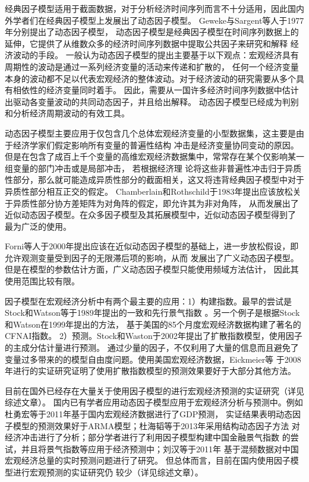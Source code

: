经典因子模型适用于截面数据，对于分析经济时间序列而言不十分适用，因此国内外学者们在经典因子模型上发展出了动态因子模型。
Geweke\cite{geweke1977dynamic}与Sargent\cite{sargent1977business}等人于1977年分别提出了动态因子模型，
动态因子模型是经典因子模型在时间序列数据上的延伸，它提供了从维数众多的经济时间序列数据中提取公共因子来研究和解释
经济波动的手段。
一般认为动态因子模型的提出主要基于以下观点：宏观经济具有周期性的波动是通过一系列经济变量的活动来传递和扩散的，
任何一个经济变量本身的波动都不足以代表宏观经济的整体波动。对于经济波动的研究需要从多个具有相依性的经济变量同时着手。
因此，需要从一国许多经济时间序列数据中估计出驱动各变量波动的共同动态因子，并且给出解释。
动态因子模型已经成为判别和分析经济周期波动的有效工具。

动态因子模型主要应用于仅包含几个总体宏观经济变量的小型数据集，这主要是由于经济学家们假定影响所有变量的普遍性结构
冲击是经济变量协同变动的原因。但是在包含了成百上千个变量的高维宏观经济数据集中，常常存在某个仅影响某一组变量的部门冲击或是局部冲击，
若根据经济理 论将这些非普遍性冲击归于异质性部分，那么就可能造成异质性部分的截面相关，这又将违背经典因子模型中对于异质性部分相互正交的假定。
Chamberlain和Rothschild于1983年提出应该放松关于异质性部分协方差矩阵为对角阵的假定，即允许其为非对角阵，
从而发展出了近似动态因子模型\cite{chamberlain1982arbitrage}。在众多因子模型及其拓展模型中，近似动态因子模型得到了
最为广泛的使用。

Forni等人于2000年提出应该在近似动态因子模型的基础上，进一步放松假设，即允许观测变量受到因子的无限滞后项的影响，从而
发展出了广义动态因子模型\cite{forni2000generalized}。但是在模型的参数估计方面，广义动态因子模型只能使用频域方法估计，
因此其使用范围比较有限。

因子模型在宏观经济分析中有两个最主要的应用：1）构建指数。最早的尝试是Stock和Watson等于1989年提出的一致和先行景气指数
\cite{stock1989new}。另一个例子是根据Stock和Watson在1999年提出的方法\cite{chan1999dynamic}，
基于美国的85个月度宏观经济数据构建了著名的CFNAI指数。
2）预测。Stock和Waston于2002年提出了扩散指数模型\cite{stock2002macroeconomic}，使用因子的主成分估计量进行预测。
通过少量的因子，不仅利用了大量的信息而且避免了变量过多带来的的模型自由度问题。使用美国宏观经济数据，Eickmeier等
于2008年进行的实证研究\cite{eickmeier2008successful}证明了使用扩散指数模型的预测效果要好于大部分其他方法。

目前在国外已经存在大量关于使用因子模型的进行宏观经济预测的实证研究（详见综述文章\cite{luciani2014large}）。
国内已有学者应用动态因子模型应用于宏观经济分析与预测中。例如杜勇宏等于2011年基于国内宏观经济数据进行了GDP预测，
实证结果表明动态因子模型的预测效果好于ARMA模型\cite{杜勇宏2011动态因子模型与}；杜海韬等于2013年采用结构动态因子方法
对经济冲击进行了分析\cite{杜海韬2013部门价格动态}；部分学者进行了利用因子模型构建中国金融景气指数\cite{韩艾2010广义动态因子模型在景气指数构建中的应用}
的尝试，并且将景气指数等应用于经济预测中\cite{何问陶2007我国宏观经济先行指标体系及对经济预测实证研究}；刘汉等于2011年
基于混频数据对中国宏观经济总量的实时预测问题进行了研究\cite{刘汉2011中国宏观经济总量的实时预报与短期预测}。
但总体而言，目前在国内使用因子模型进行宏观预测的实证研究仍
较少（详见综述文章\cite{高华川2015动态因子模型及其应用研究综述}）。

